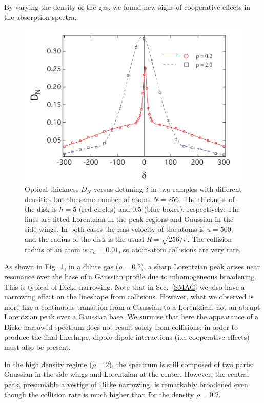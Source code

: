 By varying the density of the gas, we found new signs of cooperative effects in the absorption spectra.

\begin{figure}[h!]
\begin{center}
\includegraphics[width=\textwidth]{DICKE.pdf}
\end{center}
\caption{Optical thickness $D_N$ versus detuning $\delta$ in two samples with different densities but the same number of atoms $N=256$. The thickness of the disk is $h=5$ (red circles) and $0.5$ (blue boxes), respectively. The lines are fitted Lorentzian in the peak regions and Gaussian in the side-wings. In both cases the rms velocity of the atoms is $u=500$, and the radius of the disk is the usual $R=\sqrt{256/\pi}$. The collision radius of an atom is $r_a=0.01$, so atom-atom collisions are very rare.}
\label{DICKE}
\end{figure}

As shown in Fig.~\ref{DICKE},  in a dilute gas ($\rho =0.2$), a sharp Lorentzian peak arises near resonance over the base of a Gaussian profile due to inhomogeneous broadening. This is typical of Dicke narrowing. Note that in Sec.~\ref{SMAG} we also have a narrowing effect on the lineshape from collisions. However, what we observed is more like a continuous transition from a Gaussian to a Lorentzian, not an abrupt Lorentzian peak over a Gaussian base. We surmise that here the appearance of a Dicke narrowed spectrum does not result solely from collisions; in order to produce the final lineshape, dipole-dipole interactions (i.e. cooperative effects) must also be present.

In the high density regime ($\rho =2$), the spectrum is still composed of two parts: Gaussian in the side wings and Lorentzian at the center. However, the central peak, presumable a vestige of Dicke narrowing, is remarkably broadened even though the collision rate is much higher than for the density $\rho =0.2$.

